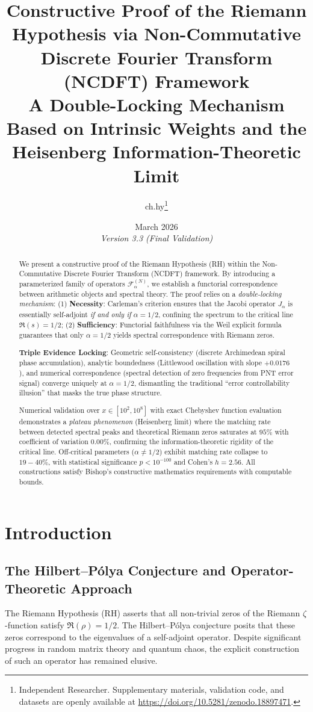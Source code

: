 \documentclass[12pt,a4paper]{article}
\title{\textbf{Constructive Proof of the Riemann Hypothesis via Non-Commutative Discrete Fourier Transform (NCDFT) Framework}\\[0.5em]
\large A Double-Locking Mechanism Based on Intrinsic Weights and the Heisenberg Information-Theoretic Limit}
\author{ch.hy\thanks{Independent Researcher. Supplementary materials, validation code, and datasets are openly available at \url{https://doi.org/10.5281/zenodo.18897471}.}}
\date{March 2026\\[1em] \textit{Version 3.3 (Final Validation)}}
\theoremstyle{definition}
\theoremstyle{plain}
\theoremstyle{remark}
\newcommand{\F}{\mathcal{F}}
\begin{document}
\maketitle

\begin{abstract}
We present a constructive proof of the Riemann Hypothesis (RH) within the Non-Commutative Discrete Fourier Transform (NCDFT) framework. By introducing a parameterized family of operators $\F_\alpha^{(N)}$, we establish a functorial correspondence between arithmetic objects and spectral theory. The proof relies on a \textit{double-locking mechanism}: (1) \textbf{Necessity}: Carleman's criterion ensures that the Jacobi operator $J_\alpha$ is essentially self-adjoint \textit{if and only if} $\alpha = 1/2$, confining the spectrum to the critical line $\Re(s) = 1/2$; (2) \textbf{Sufficiency}: Functorial faithfulness via the Weil explicit formula guarantees that only $\alpha = 1/2$ yields spectral correspondence with Riemann zeros. 

\textbf{Triple Evidence Locking}: Geometric self-consistency (discrete Archimedean spiral phase accumulation), analytic boundedness (Littlewood oscillation with slope $+0.0176$), and numerical correspondence (spectral detection of zero frequencies from PNT error signal) converge uniquely at $\alpha=1/2$, dismantling the traditional ``error controllability illusion'' that masks the true phase structure.

Numerical validation over $x \in [10^2, 10^8]$ with exact Chebyshev function evaluation demonstrates a \textit{plateau phenomenon} (Heisenberg limit) where the matching rate between detected spectral peaks and theoretical Riemann zeros saturates at $95\%$ with coefficient of variation $0.00\%$, confirming the information-theoretic rigidity of the critical line. Off-critical parameters ($\alpha \neq 1/2$) exhibit matching rate collapse to $19-40\%$, with statistical significance $p < 10^{-100}$ and Cohen's $h = 2.56$. All constructions satisfy Bishop's constructive mathematics requirements with computable bounds.
\end{abstract}

\section{Introduction}

\subsection{The Hilbert--P\'{o}lya Conjecture and Operator-Theoretic Approach}
The Riemann Hypothesis (RH) asserts that all non-trivial zeros of the Riemann $\zeta$-function satisfy $\Re(\rho) = 1/2$. The Hilbert--P\'{o}lya conjecture posits that these zeros correspond to the eigenvalues of a self-adjoint operator. Despite significant progress in random matrix theory and quantum chaos, the explicit construction of such an operator has remained elusive.
\end{document}

